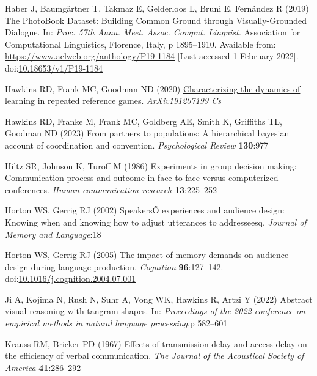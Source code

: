 \documentclass[
  english,
]{article}
\newlength{\cslhangindent}
\newlength{\cslentryspacingunit} %
\newenvironment{CSLReferences}[2] %
 {%
  \setlength{\parindent}{0pt}
  \ifodd #1
  \let\oldpar\par
  \def\par{\hangindent=\cslhangindent\oldpar}
  \fi
  \setlength{\parskip}{#2\cslentryspacingunit}
 }%
 {}
\begin{document}
\begin{CSLReferences}{1}{0}
\leavevmode{}%
Haber J, Baumgärtner T, Takmaz E, Gelderloos L, Bruni E, Fernández R (2019) The {PhotoBook Dataset}: {Building Common Ground} through {Visually-Grounded Dialogue}. In: \emph{Proc. 57th {Annu}. {Meet}. {Assoc}. {Comput}. {Linguist}.} {Association for Computational Linguistics}, {Florence, Italy}, p 1895--1910. Available from: \url{https://www.aclweb.org/anthology/P19-1184} {[}Last accessed 1 February 2022{]}. doi:\href{https://doi.org/10.18653/v1/P19-1184}{10.18653/v1/P19-1184}

\leavevmode{}%
Hawkins RD, Frank MC, Goodman ND (2020) \href{http://arxiv.org/abs/1912.07199}{Characterizing the dynamics of learning in repeated reference games}. \emph{ArXiv191207199 Cs}

\leavevmode{}%
Hawkins RD, Franke M, Frank MC, Goldberg AE, Smith K, Griffiths TL, Goodman ND (2023) From partners to populations: A hierarchical bayesian account of coordination and convention. \emph{Psychological Review} \textbf{130}:977

\leavevmode{}%
Hiltz SR, Johnson K, Turoff M (1986) Experiments in group decision making: Communication process and outcome in face-to-face versus computerized conferences. \emph{Human communication research} \textbf{13}:225--252

\leavevmode{}%
Horton WS, Gerrig RJ (2002) {SpeakersÕ} experiences and audience design: Knowing when and knowing how to adjust utterances to addresseesq. \emph{Journal of Memory and Language}:18

\leavevmode{}%
Horton WS, Gerrig RJ (2005) The impact of memory demands on audience design during language production. \emph{Cognition} \textbf{96}:127--142. doi:\href{https://doi.org/10.1016/j.cognition.2004.07.001}{10.1016/j.cognition.2004.07.001}

\leavevmode{}%
Ji A, Kojima N, Rush N, Suhr A, Vong WK, Hawkins R, Artzi Y (2022) Abstract visual reasoning with tangram shapes. In: \emph{Proceedings of the 2022 conference on empirical methods in natural language processing}.p 582--601

\leavevmode{}%
Krauss RM, Bricker PD (1967) Effects of transmission delay and access delay on the efficiency of verbal communication. \emph{The Journal of the Acoustical Society of America} \textbf{41}:286--292


\end{CSLReferences}
\end{document}
